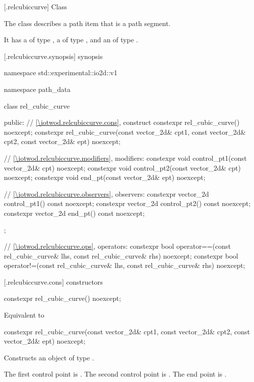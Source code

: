  [\iotwod.relcubiccurve] {Class }

\pnum
{}%
The class  describes a path item that is a path segment.

\pnum
It has a  of type , a  of type , and an  of type .

 [\iotwod.relcubiccurve.synopsis] { synopsis}

\begin{codeblock}
namespace std::experimental::io2d::v1 {
  namespace path_data {
    class rel_cubic_curve {
    public:
      // \ref{\iotwod.relcubiccurve.cons}, construct
      constexpr rel_cubic_curve() noexcept;
      constexpr rel_cubic_curve(const vector_2d& cpt1, const vector_2d& cpt2,
        const vector_2d& ept) noexcept;

      // \ref{\iotwod.relcubiccurve.modifiers}, modifiers:
      constexpr void control_pt1(const vector_2d& cpt) noexcept;
      constexpr void control_pt2(const vector_2d& cpt) noexcept;
      constexpr void end_pt(const vector_2d& ept) noexcept;

      // \ref{\iotwod.relcubiccurve.observers}, observers:
      constexpr vector_2d control_pt1() const noexcept;
      constexpr vector_2d control_pt2() const noexcept;
      constexpr vector_2d end_pt() const noexcept;
    };
    
    // \ref{\iotwod.relcubiccurve.ops}, operators:
    constexpr bool operator==(const rel_cubic_curve& lhs,
      const rel_cubic_curve& rhs) noexcept;
    constexpr bool operator!=(const rel_cubic_curve& lhs,
      const rel_cubic_curve& rhs) noexcept;
  }
}
\end{codeblock}

 [\iotwod.relcubiccurve.cons] { constructors}

%
\begin{itemdecl}
constexpr rel_cubic_curve() noexcept;
\end{itemdecl}
\begin{itemdescr}
\pnum
\effects
Equivalent to 
\end{itemdescr}

%
\begin{itemdecl}
constexpr rel_cubic_curve(const vector_2d& cpt1, const vector_2d& cpt2,
  const vector_2d& ept) noexcept;
\end{itemdecl}
\begin{itemdescr}
\pnum
\effects
Constructs an object of type .

\pnum
The first control point is . The second control point is . The end point is .
\end{itemdescr}

